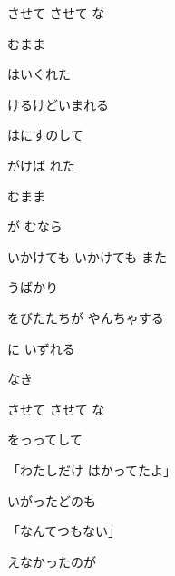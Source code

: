 \documentclass[a4paper,tate,twocolumn,12pt]{ltjtarticle}
\begin{document}
\begin{flushleft}
\begin{minipage}{\linewidth}
させて させて な

 むまま
\end{minipage}

\vspace{2em}

\noindent\begin{minipage}{\linewidth}
はいくれた

けるけどいまれる

はにすのして

がけば れた

 むまま

が むなら
\end{minipage}

\vspace{2em}

\noindent\begin{minipage}{\linewidth}
いかけても いかけても また

 うばかり

をびたたちが やんちゃする

に いずれる

なき

させて させて な
\end{minipage}

\vspace{2em}

\noindent\begin{minipage}{\linewidth}
をっってして

「わたしだけ はかってたよ」

いがったどのも

「なんてつもない」

えなかったのが


\end{minipage}
\end{flushleft}
\end{document}
